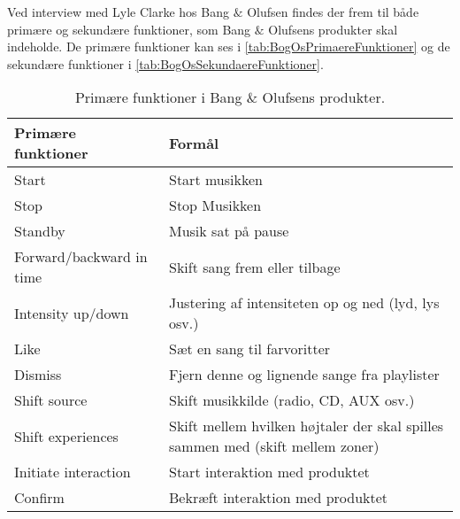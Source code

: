 
Ved interview med Lyle Clarke hos Bang $\&$ Olufsen findes der frem til både primære og sekundære funktioner, som Bang $\&$ Olufsens produkter skal indeholde. De primære funktioner kan ses i \autoref{tab:BogOsPrimaereFunktioner} og de sekundære funktioner i \autoref{tab:BogOsSekundaereFunktioner}.

%
\begin{table}[H]
	\centering
	\begin{tabular}{ | l | p{8cm} |}
		\hline
		\multicolumn{1}{|l|}{\textbf{Primære funktioner}} & \multicolumn{1}{l|}{\textbf{Formål}} \\ \hline
		Start & Start musikken \\ \hline
		Stop & Stop Musikken \\ \hline
		Standby & Musik sat på pause \\ \hline
		Forward/backward in time & Skift sang frem eller tilbage \\ \hline
		Intensity up/down & Justering af intensiteten op og ned (lyd, lys osv.) \\ \hline
		Like & Sæt en sang til farvoritter \\ \hline
		Dismiss & Fjern denne og lignende sange fra playlister \\ \hline
		Shift source & Skift musikkilde (radio, CD, AUX osv.) \\ \hline
		Shift experiences & Skift mellem hvilken højtaler der skal spilles sammen med (skift mellem zoner) \\ \hline
		Initiate interaction & Start interaktion med produktet \\ \hline
		Confirm & Bekræft interaktion med produktet \\ \hline
	\end{tabular}
	\caption{Primære funktioner i Bang $\&$ Olufsens produkter.}
	\label{tab:BogOsPrimaereFunktioner}
\end{table}
\noindent
%

